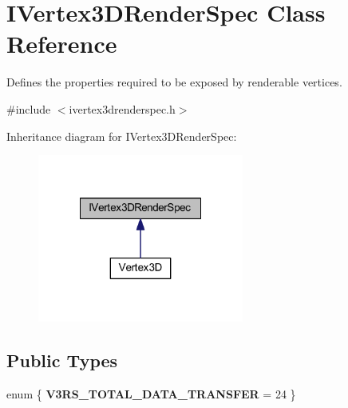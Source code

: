 \hypertarget{class_i_vertex3_d_render_spec}{\section{I\-Vertex3\-D\-Render\-Spec Class Reference}
\label{class_i_vertex3_d_render_spec}
}


Defines the properties required to be exposed by renderable vertices.  




{\ttfamily \#include $<$ivertex3drenderspec.\-h$>$}



Inheritance diagram for I\-Vertex3\-D\-Render\-Spec\-:
\nopagebreak
\begin{figure}[H]
\begin{center}
\leavevmode
\includegraphics[width=192pt]{class_i_vertex3_d_render_spec__inherit__graph}
\end{center}
\end{figure}
\subsection*{Public Types}
\begin{DoxyCompactItemize}
\item 
enum \{ {\bfseries V3\-R\-S\-\_\-\-T\-O\-T\-A\-L\-\_\-\-D\-A\-T\-A\-\_\-\-T\-R\-A\-N\-S\-F\-E\-R} = 24
 \}
\end{DoxyCompactItemize}
